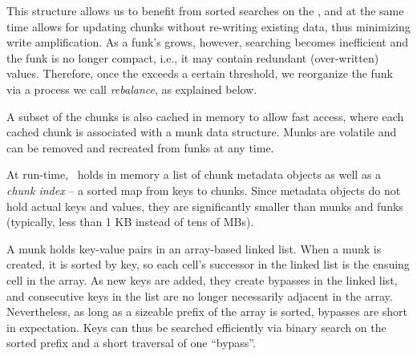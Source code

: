 
This structure allows us to benefit from sorted searches on the , and at the same time
allows for updating chunks without re-writing existing data, thus minimizing write amplification.
As a funk's   grows, however, searching becomes inefficient   and  
the funk is no longer compact, i.e., it may contain redundant (over-written) values.
Therefore, once the   exceeds a certain threshold, we reorganize the funk
via a process we call \emph{rebalance}, as explained below.

A subset of the chunks is also cached in memory to allow fast access, where each cached chunk is associated with a
munk data structure. 
Munks are volatile and can be removed and recreated from funks at any time.

At run-time, \sys\ holds in memory a list of chunk metadata objects as well as 
a \emph{chunk index} -- a sorted map from keys to chunks.
Since metadata objects do not hold actual keys and values, they are significantly smaller than munks and funks
(typically, less than 1 KB instead of tens of MBs).

A munk holds key-value pairs in an array-based linked list.  
When a munk is created, 
it is sorted by key, so each cell's successor in the linked list is the ensuing cell in the array.
As new keys are added, they create bypasses in the linked list, and consecutive keys in the
list are no longer necessarily adjacent in the array. Nevertheless, as long as 
a sizeable prefix of the  array  is sorted, bypasses are short in expectation.
Keys can thus be searched efficiently via binary search on the sorted prefix and a short traversal of one ``bypass''. 


